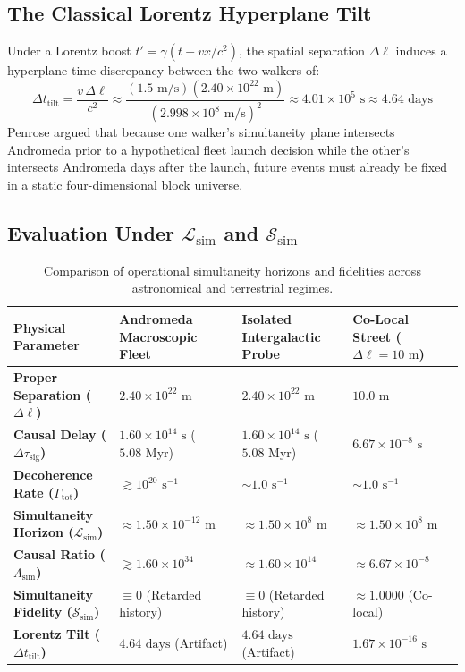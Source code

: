 \documentclass[11pt,a4paper]{article}
\begin{document}
\subsection{The Classical Lorentz Hyperplane Tilt}
Under a Lorentz boost $t' = \gamma(t - vx/c^2)$, the spatial separation $\Delta \ell$ induces a hyperplane time discrepancy between the two walkers of:
\begin{equation}
    \Delta t_{\mathrm{tilt}} = \frac{v\,\Delta \ell}{c^2} \approx \frac{(1.5\text{ m/s})(2.40 \times 10^{22}\text{ m})}{(2.998 \times 10^8\text{ m/s})^2} \approx 4.01 \times 10^5\text{ s} \approx 4.64\text{ days}
\end{equation}
Penrose argued that because one walker's simultaneity plane intersects Andromeda prior to a hypothetical fleet launch decision while the other's intersects Andromeda days after the launch, future events must already be fixed in a static four-dimensional block universe.

\subsection{Evaluation Under $\mathcal{L}_{\mathrm{sim}}$ and $\mathcal{S}_{\mathrm{sim}}$}

\begin{table}[h!]
\centering
\small
\renewcommand{\arraystretch}{1.25}
\begin{tabular}{>{\bfseries}p{4.1cm} p{3.3cm} p{3.3cm} p{3.3cm}}
\toprule
Physical Parameter & Andromeda Macroscopic Fleet & Isolated Intergalactic Probe & Co-Local Street ($\Delta \ell = 10\text{ m}$) \\
\midrule
Proper Separation ($\Delta \ell$) & $2.40 \times 10^{22}\text{ m}$ & $2.40 \times 10^{22}\text{ m}$ & $10.0\text{ m}$ \\
Causal Delay ($\Delta \tau_{\mathrm{sig}}$) & $1.60 \times 10^{14}\text{ s}$ ($5.08\text{ Myr}$) & $1.60 \times 10^{14}\text{ s}$ ($5.08\text{ Myr}$) & $6.67 \times 10^{-8}\text{ s}$ \\
Decoherence Rate ($\Gamma_{\mathrm{tot}}$) & $\gtrsim 10^{20}\text{ s}^{-1}$ & $\sim 1.0\text{ s}^{-1}$ & $\sim 1.0\text{ s}^{-1}$ \\
Simultaneity Horizon ($\mathcal{L}_{\mathrm{sim}}$) & $\approx 1.50 \times 10^{-12}\text{ m}$ & $\approx 1.50 \times 10^8\text{ m}$ & $\approx 1.50 \times 10^8\text{ m}$ \\
Causal Ratio ($\Lambda_{\mathrm{sim}}$) & $\gtrsim 1.60 \times 10^{34}$ & $\approx 1.60 \times 10^{14}$ & $\approx 6.67 \times 10^{-8}$ \\
Simultaneity Fidelity ($\mathcal{S}_{\mathrm{sim}}$) & $\equiv 0$ (Retarded history) & $\equiv 0$ (Retarded history) & $\approx 1.0000$ (Co-local) \\
Lorentz Tilt ($\Delta t_{\mathrm{tilt}}$) & $4.64\text{ days}$ (Artifact) & $4.64\text{ days}$ (Artifact) & $1.67 \times 10^{-16}\text{ s}$ \\
\bottomrule
\end{tabular}
\caption{Comparison of operational simultaneity horizons and fidelities across astronomical and terrestrial regimes.}
\end{table}
\end{document}
